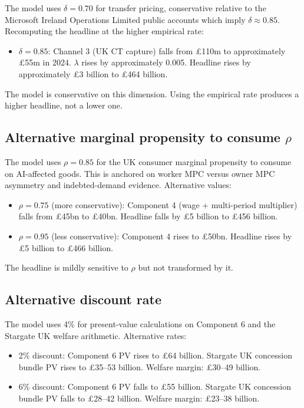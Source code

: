 \documentclass[11pt,letterpaper]{article}
\theoremstyle{remark}
\begin{document}
The model uses $\delta = 0.70$ for transfer pricing, conservative relative to the Microsoft Ireland Operations Limited public accounts which imply $\delta \approx 0.85$. Recomputing the headline at the higher empirical rate:

\begin{itemize}
\item $\delta = 0.85$: Channel 3 (UK CT capture) falls from \pounds110m to approximately \pounds55m in 2024. $\lambda$ rises by approximately 0.005. Headline rises by approximately \pounds3 billion to \pounds464 billion.
\end{itemize}

The model is conservative on this dimension. Using the empirical rate produces a higher headline, not a lower one.

\subsection{Alternative marginal propensity to consume $\rho$}

The model uses $\rho = 0.85$ for the UK consumer marginal propensity to consume on AI-affected goods. This is anchored on \citet{kaldor_1956} worker MPC versus owner MPC asymmetry and \citet{mian_straub_sufi_2021} indebted-demand evidence. Alternative values:

\begin{itemize}
\item $\rho = 0.75$ (more conservative): Component 4 (wage + multi-period multiplier) falls from \pounds45bn to \pounds40bn. Headline falls by \pounds5 billion to \pounds456 billion.
\item $\rho = 0.95$ (less conservative): Component 4 rises to \pounds50bn. Headline rises by \pounds5 billion to \pounds466 billion.
\end{itemize}

The headline is mildly sensitive to $\rho$ but not transformed by it.

\subsection{Alternative discount rate}

The model uses 4\% for present-value calculations on Component 6 and the Stargate UK welfare arithmetic. Alternative rates:

\begin{itemize}
\item 2\% discount: Component 6 PV rises to \pounds64 billion. Stargate UK concession bundle PV rises to \pounds35--53 billion. Welfare margin: \pounds30--49 billion.
\item 6\% discount: Component 6 PV falls to \pounds55 billion. Stargate UK concession bundle PV falls to \pounds28--42 billion. Welfare margin: \pounds23--38 billion.
\end{itemize}
\end{document}
